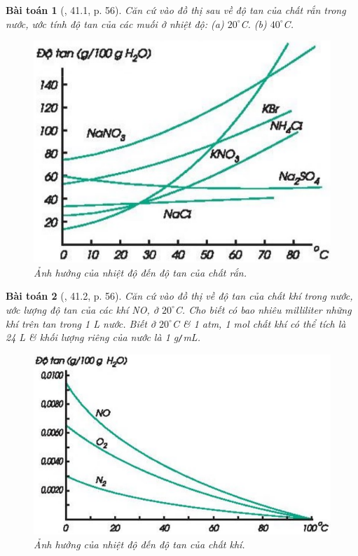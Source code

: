 \documentclass{article}
\newtheorem{baitoan}{Bài toán}
\begin{document}
\begin{baitoan}[\cite{SBT_Hoa_Hoc_8}, 41.1, p. 56]
	Căn cứ vào đồ thị sau về độ tan của chất rắn trong nước, ước tính độ tan của các muối \emph{} ở nhiệt độ: (a) $20^\circ$\emph{C}. (b) $40^\circ$\emph{C}.
	\begin{figure}[H]
		\centering
		\includegraphics[scale=0.3]{nhiet_do_do_tan_chat_ran}
		\caption{Ảnh hưởng của nhiệt độ đến độ tan của chất rắn.}
		\label{fig:nhiet_do_do_tan_chat_ran}
	\end{figure}
\end{baitoan}

\begin{baitoan}[\cite{SBT_Hoa_Hoc_8}, 41.2, p. 56]
	Căn cứ vào đồ thị về độ tan của chất khí trong nước, ước lượng độ tan của các khí \emph{NO, } ở $20^\circ$\emph{C}. Cho biết có bao nhiêu milliliter những khí trên tan trong \emph{1 L} nước. Biết ở $20^\circ$\emph{C} \& \emph{1 atm, 1 mol} chất khí có thể tích là \emph{24 L} \& khối lượng riêng của nước là \emph{1 g\texttt{/}mL}.	
	\begin{figure}[H]
		\centering
		\includegraphics[scale=0.3]{nhiet_do_do_tan_chat_khi}
		\caption{Ảnh hưởng của nhiệt độ đến độ tan của chất khí.}
		\label{fig:nhiet_do_do_tan_chat_khi}
	\end{figure}
\end{baitoan}
\end{document}
